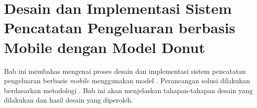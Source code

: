\chapter{Desain dan Implementasi Sistem Pencatatan Pengeluaran berbasis Mobile dengan Model Donut}
\label{chapter:desain-implementasi}
Bab ini membahas mengenai proses desain dan implementasi sistem pencatatan pengeluaran berbasis \emph{mobile} menggunakan model \donut. Perancangan solusi dilakukan berdasarkan metodologi \dsrm. Bab ini akan menjelaskan tahapan-tahapan desain yang dilakukan dan hasil desain yang diperoleh.





